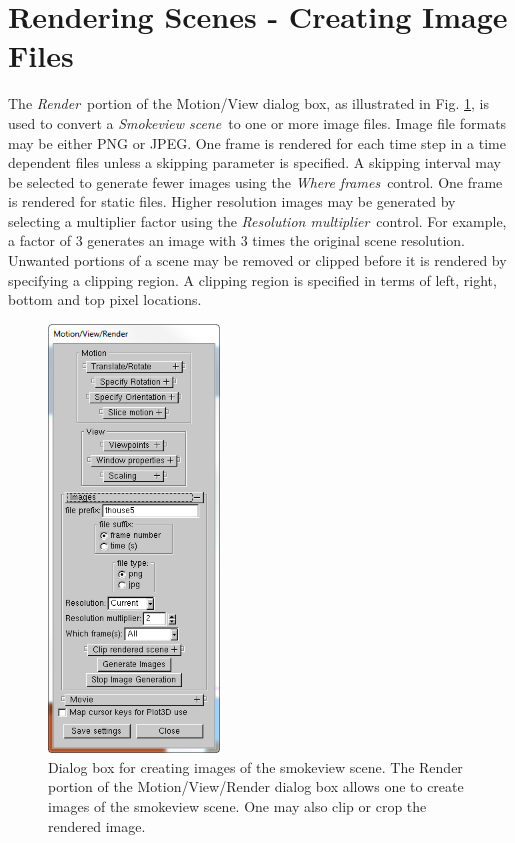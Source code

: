 \documentclass[11pt,twoside]{book}
\begin{document}
\section{Rendering Scenes - Creating Image Files}
The {\em Render}\ portion of the Motion/View dialog box,
as illustrated in Fig. \ref{figMOTIONrender}, is used to convert a {\em Smokeview scene}\ to one or more image files.  Image file formats may be either PNG or JPEG. One frame is rendered for each time step in a time dependent files unless a skipping parameter is specified.
A skipping interval may be selected to generate fewer images using the {\em Where frames}\ control.  One frame is rendered for static files.  Higher resolution images may be generated by selecting a multiplier factor using the {\em Resolution multiplier}\ control. For example, a factor of 3 generates an image with 3 times the original scene resolution.  Unwanted portions of a scene may be removed or clipped before it is rendered by specifying a clipping region. A clipping region is specified in terms of left, right, bottom and top pixel locations.

\begin{figure}[bph]
\begin{center}
\includegraphics[width=1.79166667in]{FIGURES/figIMAGES}
\caption[Dialog box for creating images of the smokeview scene.]
{Dialog box for creating images of the smokeview scene. The Render portion of the Motion/View/Render dialog box allows one to create images of the smokeview scene. One may also clip or crop the rendered image.}
\label{figMOTIONrender}
\end{center}
\end{figure}
\end{document}
